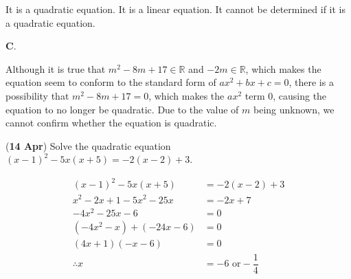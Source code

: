\documentclass[12pt, answers]{exam}
\newcommand{\reals}{\mathbb{R}}
\begin{document}
\begin{questions}
	\begin{choices}
		\choice It is a quadratic equation.
		\choice It is a linear equation.
		\choice It cannot be determined if it is a quadratic equation.
	\end{choices}

	\begin{solution}
		\textbf{C}.

		Although it is true that \(m^{2} - 8m + 17 \in \reals\) and \(-2m \in \reals\),
		which makes the equation seem to conform to the standard form of
		\(ax^{2} + bx + c = 0\), there is a possibility that
		\(m^{2} - 8m + 17 = 0\), which makes the \(ax^{2}\) term \(0\),
		causing the equation to no longer be quadratic. Due to the value of \(m\) being unknown, we cannot confirm
		whether the equation is quadratic.
	\end{solution}

	\question (\textbf{14 Apr}) Solve the quadratic equation
	\((x - 1)^{2} - 5x(x + 5) = -2(x - 2) + 3\).
	\begin{solution}
		\begin{align*}
			(x - 1)^{2} - 5x(x + 5)                          & = -2(x - 2) + 3               \\
			x^{2} - 2x + 1 - 5x^{2} - 25x                    & = -2x + 7                     \\
			-4x^{2} - 25x - 6                                & = 0                           \\
			\left(-4x^{2} - x\right) + \left(-24x - 6\right) & = 0                           \\
			(4x + 1)(- x - 6)                                & = 0                           \\
			\therefore x                                     & = -6 \text{ or} -\dfrac{1}{4}
		\end{align*}
	\end{solution}
\end{questions}
\end{document}
